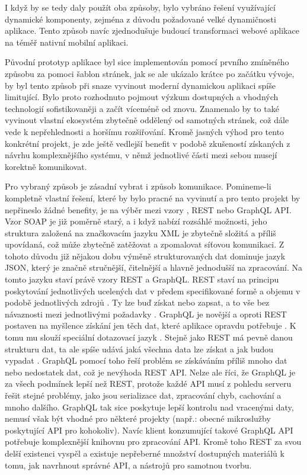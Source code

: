 	I když by se tedy daly použít oba způsoby, bylo vybráno řešení využívající dynamické komponenty,
	zejména z důvodu požadované velké dynamičnosti aplikace.
	Tento způsob navíc zjednodušuje budoucí transformaci webové aplikace na téměř nativní mobilní aplikaci.

	Původní prototyp aplikace byl sice implementován pomocí prvního zmíněného způsobu za pomoci šablon stránek, jak se
	ale ukázalo krátce po začátku vývoje, by byl tento způsob při snaze vyvinout moderní dynamickou aplikaci spíše limitující.
	Bylo proto rozhodnuto pojmout výzkum dostupných a vhodných technologií sofistikovaněji a začít víceméně od znovu.
	Znamenalo by to také vyvinout vlastní ekosystém zbytečně oddělený od samotných stránek,
	což dále vede k nepřehlednosti a horšímu rozšiřování.
	Kromě jasných výhod pro tento konkrétní projekt, je zde ještě vedlejší benefit v podobě zkušeností získaných
	z návrhu komplexnějšího systému, v němž jednotlivé části mezi sebou musejí korektně komunikovat.

	Pro vybraný způsob je zásadní vybrat i způsob komunikace.
	Pomineme-li kompletně vlastní řešení, které by bylo pracné na vyvinutí a pro tento projekt by nepřineslo žádné benefity,
	je na výběr mezi vzory , \ac{REST} nebo GraphQL \ac{API}.
	Vzor \ac{SOAP} je již poměrně starý, a i když nabízí rozsáhlé možnosti, jeho struktura založená na značkovacím jazyku
	\ac{XML} je zbytečně složitá a příliš upovídaná, což může zbytečně zatěžovat a zpomalovat
	síťovou komunikaci.
	Z tohoto důvodu již nějakou dobu výměně strukturovaných dat dominuje jazyk \ac{JSON}, který je značně stručnější,
	čitelnější a hlavně jednodušší na zpracování.
	Na tomto jazyku staví právě vzory \ac{REST} a GraphQL.
	\ac{REST} staví na principu poskytování jednotlivých ucelených dat v předem specifikované formě a objemu v
	podobě jednotlivých zdrojů \cite{restfulapi}.
	Ty lze buď získat nebo zapsat, a to vše bez návaznosti mezi jednotlivými požadavky
	\cite{restfulapi}.
	GraphQL je novější a oproti \ac{REST} postaven na myšlence získání jen těch dat, které aplikace opravdu potřebuje \cite{graphql}.
	K tomu mu slouží speciální dotazovací jazyk \cite{graphql}.
	Stejně jako \ac{REST} má pevně danou strukturu dat, ta ale spíše udává jaká všechna data lze získat a jak budou vypadat \cite{graphql}.
	GraphQL pomocí toho řeší problém se získáváním příliš mnoho dat nebo nedostatek dat, což je nevýhoda \ac{REST} \ac{API}.
	Nelze ale říci, že GraphQL je za všech podmínek lepší než \ac{REST}, protože každé \ac{API} musí z pohledu serveru
	řešit stejné problémy, jako jsou serializace dat, zpracování chyb, cachování a mnoho dalšího.
	GraphQL tak sice poskytuje lepší kontrolu nad vracenými daty, nemusí však být vhodné pro některé projekty (např.:
	obecné mikroslužby poskytující \ac{API} pro kohokoliv).
	Navíc klient konzumující takové GraphQL \ac{API} potřebuje
	komplexnější knihovnu pro zpracování \ac{API}.
	Kromě toho \ac{REST} za svou delší existenci vyspěl a existuje nepřeberné množství dostupných materiálů k tomu, jak navrhnout
	správné \ac{API}, a nástrojů pro samotnou tvorbu.

